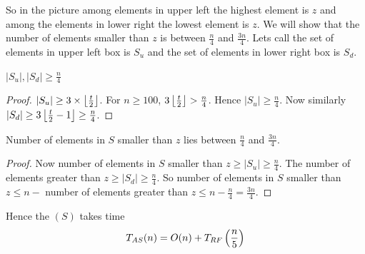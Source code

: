 So in the picture among elements in upper left the highest element is $z$ and among the elements in lower right the lowest element is $z$. We will show that the number of elements smaller than $z$ is between $\frac{n}{4} $ and $\frac{3n}{4}$. Lets call the set of elements in upper left box is $S_u$ and the set of elements in lower right box is $S_d$.

\begin{lemma}{}{}
	$|S_u|,|S_d|\geq\frac{n}{4}$
\end{lemma}
\begin{proof}
	$|S_u|\geq 3\times \left\lfloor\frac{t}{2}\right\rfloor$. For $n\geq 100$, $3\left\lfloor\frac{t}{2}\right\rfloor> \frac{n}{4}$. Hence $|S_u|\geq \frac{n}{4}$. Now similarly $|S_d|\geq 3\left\lfloor\frac{t}{2}-1\right\rfloor\geq \frac{n}{4}$.
\end{proof}
\begin{lemma}{}{}
	Number of elements in $S$ smaller than $z$ lies between $\frac{n}4$ and $\frac{3n}{4}$.
\end{lemma}
\begin{proof}
	Now number of elements in $S$ smaller than $z\geq |S_u|\geq \frac{n}4$. The number of elements greater than $z\geq |S_d|\geq \frac{n}{4}$. So number of elements in $S$ smaller than $z\leq n-$ number of elements greater than $z\leq n-\frac{n}4=\frac{3n}{4}$.
\end{proof}
Hence the $(S)$ takes time $$T_{AS}(n)=O(n)+T_{RF}\left(\frac{n}{5}\right)$$
